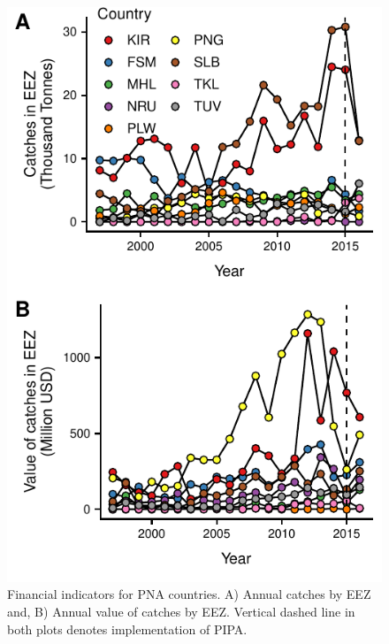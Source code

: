 \documentclass[9p,twocolumn,twoside,lineno]{pnas-new}
\begin{document}
\clearpage

\begin{figure}
\centering
	\includegraphics{img/catches.pdf}
	\caption{\label{fig:catches}Financial indicators for PNA countries. A) Annual catches by EEZ and, B) Annual value of catches by EEZ. Vertical dashed line in both plots denotes implementation of PIPA.}
\end{figure}

\clearpage
\end{document}
